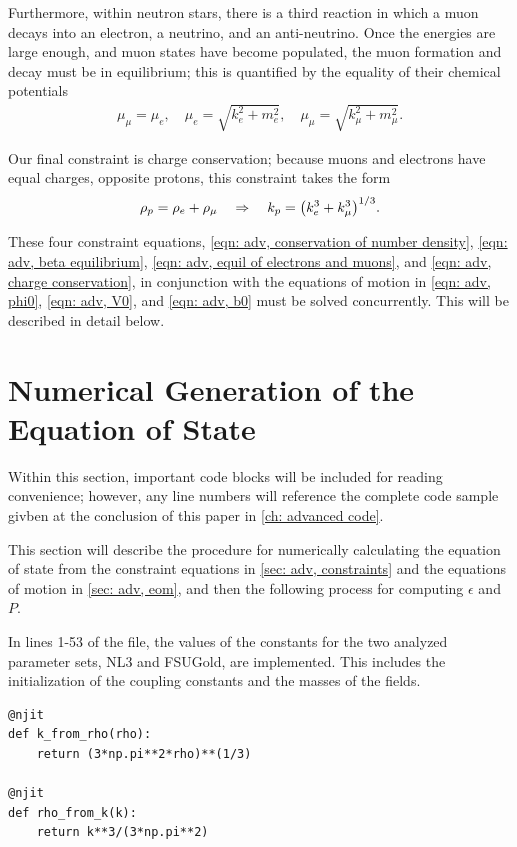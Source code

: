 Furthermore, within neutron stars, there is a third reaction in which a muon decays into an electron, a neutrino, and an anti-neutrino. Once the energies are large enough, and muon states have become populated, the muon formation and decay must be in equilibrium; this is quantified by the equality of their chemical potentials
\begin{align}\label{eqn: adv, equil of electrons and muons}
    \mu_\mu = \mu_e,\quad \mu_e  = \sqrt{k_e^2 + m_e^2}, \quad \mu_\mu  = \sqrt{k_\mu^2 + m_\mu^2}.
\end{align}

Our final constraint is charge conservation; because muons and electrons have equal charges, opposite protons, this constraint takes the form
\begin{align}\label{eqn: adv, charge conservation}
    \rho_p = \rho_e + \rho_\mu \goesto k_p = \pqty{k_e^3 + k_\mu^3}^{1/3}.
\end{align}

These four constraint equations, \eqref{eqn: adv, conservation of number density}, \eqref{eqn: adv, beta equilibrium}, \eqref{eqn: adv, equil of electrons and muons}, and \eqref{eqn: adv, charge conservation}, in conjunction with the equations of motion in \eqref{eqn: adv, phi0}, \eqref{eqn: adv, V0}, and \eqref{eqn: adv, b0} must be solved concurrently. This will be described in detail below.

\section{Numerical Generation of the Equation of State}\label{sec: adv, gen}

Within this section, important code blocks will be included for reading convenience; however, any line numbers will reference the complete code sample givben at the conclusion of this paper in \autoref{ch: advanced code}.

This section will describe the procedure for numerically calculating the equation of state from the constraint equations in \autoref{sec: adv, constraints} and the equations of motion in \autoref{sec: adv, eom}, and then the following process for computing $\epsilon$ and $P$.

In lines 1-53 of the file, the values of the constants for the two analyzed parameter sets, NL3 and FSUGold, are implemented. This includes the initialization of the coupling constants and the masses of the fields. 

\begin{lstlisting}
@njit
def k_from_rho(rho):
    return (3*np.pi**2*rho)**(1/3)

@njit
def rho_from_k(k):
    return k**3/(3*np.pi**2)
\end{lstlisting}

